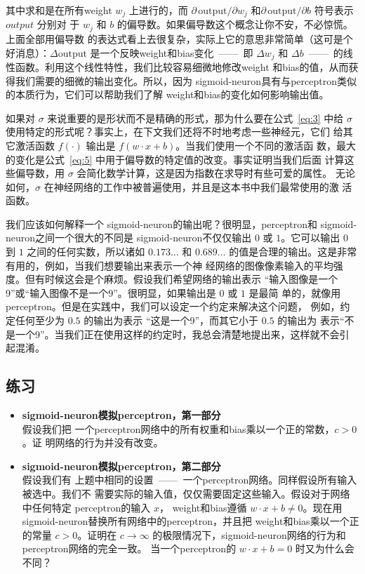 其中求和是在所有\gls*{weight} $w_j$ 上进行的，而 $\partial \, \mbox{output} /
\partial w_j$ 和$\partial \, \mbox{output} /\partial b$ 符号表示 $output$ 分别对
于 $w_j$ 和 $b$ 的偏导数。如果偏导数这个概念让你不安，不必惊慌。上面全部用偏导数
的表达式看上去很复杂，实际上它的意思非常简单（这可是个好消息）：$\Delta
\mbox{output}$ 是一个反映\gls*{weight}和\gls*{bias}变化~——~即 $\Delta w_j$ 和
$\Delta b$~——~的线性函数。利用这个线性特性，我们比较容易细微地修改\gls*{weight}
和\gls*{bias}的值，从而获得我们需要的细微的输出变化。所以，因为%
\gls*{sigmoid-neuron}具有与\gls*{perceptron}类似的本质行为，它们可以帮助我们了解%
\gls*{weight}和\gls*{bias}的变化如何影响输出值。

如果对 $\sigma$ 来说重要的是形状而不是精确的形式，那为什么要在公式~\eqref{eq:3}
中给 $\sigma$ 使用特定的形式呢？事实上，在下文我们还将不时地考虑一些神经元，它们
给其它激活函数 $f(\cdot)$ 输出是 $f(w \cdot x + b)$。当我们使用一个不同的激活函
数，最大的变化是公式~\eqref{eq:5} 中用于偏导数的特定值的改变。事实证明当我们后面
计算这些偏导数，用 $\sigma$ 会简化数学计算，这是因为指数在求导时有些可爱的属性。
无论如何，$\sigma$ 在神经网络的工作中被普遍使用，并且是这本书中我们最常使用的激
活函数。

我们应该如何解释一个 \gls*{sigmoid-neuron}的输出呢？很明显，\gls*{perceptron}和
\gls*{sigmoid-neuron}之间一个很大的不同是 \gls*{sigmoid-neuron}不仅仅输出 $0$ 或
$1$。它可以输出 $0$ 到 $1$ 之间的任何实数，所以诸如 $0.173\ldots$ 和
$0.689\ldots$ 的值是合理的输出。这是非常有用的，例如，当我们想要输出来表示一个神
经网络的图像像素输入的平均强度。但有时候这会是个麻烦。假设我们希望网络的输出表示
“输入图像是一个9”或“输入图像不是一个9”。很明显，如果输出是 $0$ 或 $1$ 是最简
单的，就像用\gls*{perceptron}。但是在实践中，我们可以设定一个约定来解决这个问题，
例如，约定任何至少为 $0.5$ 的输出为表示 “这是一个9”，而其它小于 $0.5$ 的输出为
表示“不是一个9”。当我们正在使用这样的约定时，我总会清楚地提出来，这样就不会引
起混淆。

\subsection*{练习}

\begin{itemize}
\item \textbf{\gls*{sigmoid-neuron}模拟\gls*{perceptron}，第一部分}\\假设我们把
  一个\gls*{perceptron}网络中的所有权重和\gls*{bias}乘以一个正的常数，$c>0$。证
  明网络的行为并没有改变。
\item \textbf{\gls*{sigmoid-neuron}模拟\gls*{perceptron}，第二部分}\\假设我们有
  上题中相同的设置~——~一个\gls*{perceptron}网络。同样假设所有输入被选中。我们不
  需要实际的输入值，仅仅需要固定这些输入。假设对于网络中任何特定%
  \gls*{perceptron}的输入 $x$， \gls*{weight}和\gls*{bias}遵循 $w \cdot x + b
  \neq 0$。现在用 \gls*{sigmoid-neuron}替换所有网络中的\gls*{perceptron}，并且把%
  \gls*{weight}和\gls*{bias}乘以一个正的常量 $c>0$。证明在 $c \rightarrow \infty$
  的极限情况下，\gls*{sigmoid-neuron}网络的行为和\gls*{perceptron}网络的完全一致。
  当一个\gls*{perceptron}的 $w \cdot x + b = 0$ 时又为什么会不同？
\end{itemize}

